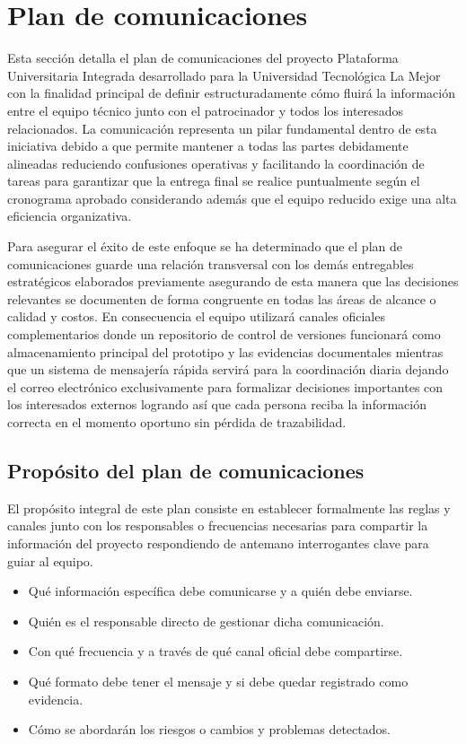\documentclass[11pt,spanish]{article}
\begin{document}
\section{Plan de comunicaciones}

Esta sección detalla el plan de comunicaciones del proyecto Plataforma Universitaria Integrada desarrollado para la Universidad Tecnológica La Mejor con la finalidad principal de definir estructuradamente cómo fluirá la información entre el equipo técnico junto con el patrocinador y todos los interesados relacionados. La comunicación representa un pilar fundamental dentro de esta iniciativa debido a que permite mantener a todas las partes debidamente alineadas reduciendo confusiones operativas y facilitando la coordinación de tareas para garantizar que la entrega final se realice puntualmente según el cronograma aprobado considerando además que el equipo reducido exige una alta eficiencia organizativa.

Para asegurar el éxito de este enfoque se ha determinado que el plan de comunicaciones guarde una relación transversal con los demás entregables estratégicos elaborados previamente asegurando de esta manera que las decisiones relevantes se documenten de forma congruente en todas las áreas de alcance o calidad y costos. En consecuencia el equipo utilizará canales oficiales complementarios donde un repositorio de control de versiones funcionará como almacenamiento principal del prototipo y las evidencias documentales mientras que un sistema de mensajería rápida servirá para la coordinación diaria dejando el correo electrónico exclusivamente para formalizar decisiones importantes con los interesados externos logrando así que cada persona reciba la información correcta en el momento oportuno sin pérdida de trazabilidad.

\subsection{Propósito del plan de comunicaciones}

El propósito integral de este plan consiste en establecer formalmente las reglas y canales junto con los responsables o frecuencias necesarias para compartir la información del proyecto respondiendo de antemano interrogantes clave para guiar al equipo.

\begin{itemize}
    \item Qué información específica debe comunicarse y a quién debe enviarse.
    \item Quién es el responsable directo de gestionar dicha comunicación.
    \item Con qué frecuencia y a través de qué canal oficial debe compartirse.
    \item Qué formato debe tener el mensaje y si debe quedar registrado como evidencia.
    \item Cómo se abordarán los riesgos o cambios y problemas detectados.
\end{itemize}
\end{document}
